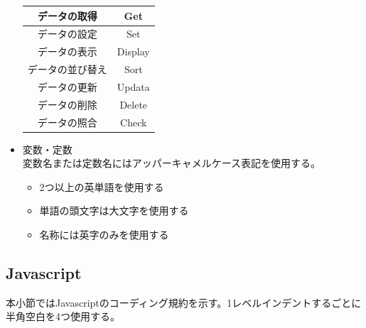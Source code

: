 \documentclass[a4j]{jarticle}
\begin{document}
\begin{itemize}
\begin{table}[H]
			\label{tab:o2}
			\begin{center}
			\begin{tabular}{|c|c|}
			\hline
			データの取得 & Get\\\hline
			データの設定 & Set\\\hline
			データの表示 & Display\\\hline
			データの並び替え & Sort\\\hline
			データの更新  & Updata\\\hline
			データの削除  & Delete\\\hline
			データの照合 & Check\\\hline
			\end{tabular}
			\end{center}
			\end{table}
	\item 変数・定数\\
		変数名または定数名にはアッパーキャメルケース表記を使用する。
	\begin{itemize}
		\item 2つ以上の英単語を使用する
		\item 単語の頭文字は大文字を使用する
		\item 名称には英字のみを使用する
	\end{itemize}


\end{itemize}
\subsection{Javascript}

本小節ではJavascriptのコーディング規約を示す。1レベルインデントするごとに半角空白を4つ使用する。
\end{document}
